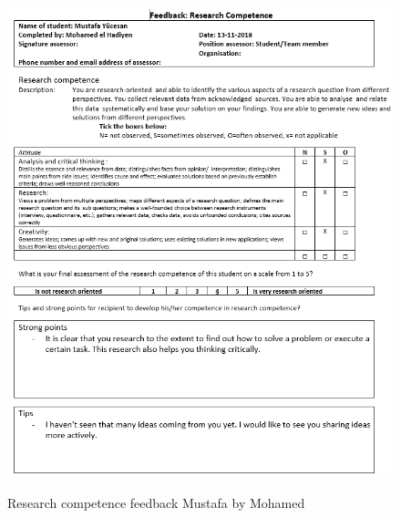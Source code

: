 \documentclass[12pt]{article}
\begin{document}
	\begin{figure}[p!]
		\centering
		\includegraphics[width=\columnwidth]{ResSklMustafa1.PNG}\\
		\caption{Research competence feedback Mustafa by Mohamed}
	\end{figure}
\end{document}
